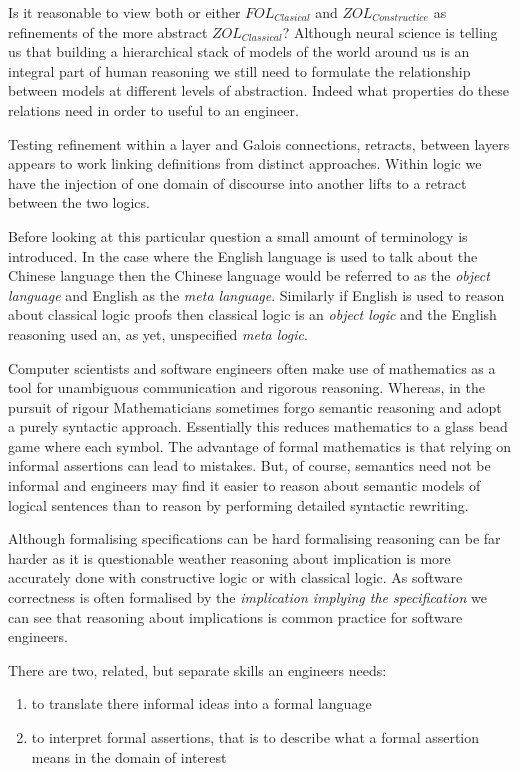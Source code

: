 Is it reasonable to view both or either  $FOL_{Clasical}$ and $ZOL_{Constructice}$ as refinements of the more abstract $ZOL_{Classical}$? Although neural science is telling us that building a hierarchical stack of models of the world around us is an integral part of human reasoning we still need to formulate the relationship  between models at different levels of abstraction. Indeed what properties do these relations  need in order to useful to an engineer.

Testing refinement within a layer and Galois connections, retracts, between layers appears to work linking definitions from distinct approaches. Within logic we have  the injection of one domain of discourse into another lifts to a retract between the two logics.


Before  looking at this particular question a small amount of terminology is introduced.  In the case where   the English language is used to talk about the Chinese language then the  Chinese language would be referred to as the \emph{object language} and English as the \emph{meta language}. Similarly if  English is used to reason about classical logic proofs then classical logic is an \emph{object logic} and the English reasoning used an, as yet, unspecified \emph{meta logic}.

Computer scientists and software engineers often make use of mathematics as a tool for unambiguous communication and rigorous reasoning. Whereas, in the pursuit of rigour Mathematicians sometimes  forgo semantic reasoning and adopt a purely syntactic approach. Essentially this reduces mathematics to a glass bead game where each symbol. The advantage of formal mathematics is that relying on informal assertions can lead to mistakes.  But, of course, semantics need not be informal and engineers may find it easier to reason about semantic models of logical sentences than to reason by performing  detailed syntactic rewriting.

 Although formalising specifications can be hard formalising reasoning can be far harder as it is questionable weather reasoning about implication is more accurately done with constructive logic or with classical logic. As software correctness is often formalised by the  \emph{implication implying the specification} we can see that reasoning about implications is common practice for software engineers.
 
There are two, related, but  separate  skills an engineers needs: 
\begin{enumerate}
\item to translate there informal ideas into a formal language
\item to interpret formal assertions, that is to describe what a formal assertion means in the domain of interest
\end{enumerate}
 
